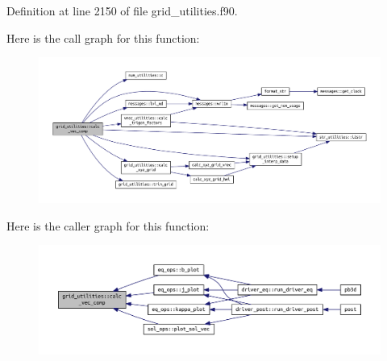 Definition at line 2150 of file grid\+\_\+utilities.\+f90.

Here is the call graph for this function\+:
\nopagebreak
\begin{figure}[H]
\begin{center}
\leavevmode
\includegraphics[width=350pt]{namespacegrid__utilities_a3076796477d38ffed189868b3b28efb1_cgraph}
\end{center}
\end{figure}
Here is the caller graph for this function\+:
\nopagebreak
\begin{figure}[H]
\begin{center}
\leavevmode
\includegraphics[width=350pt]{namespacegrid__utilities_a3076796477d38ffed189868b3b28efb1_icgraph}
\end{center}
\end{figure}
\mbox{\label{namespacegrid__utilities_a39e7cd9b8f173994358dbdd6b57827e1}} 
